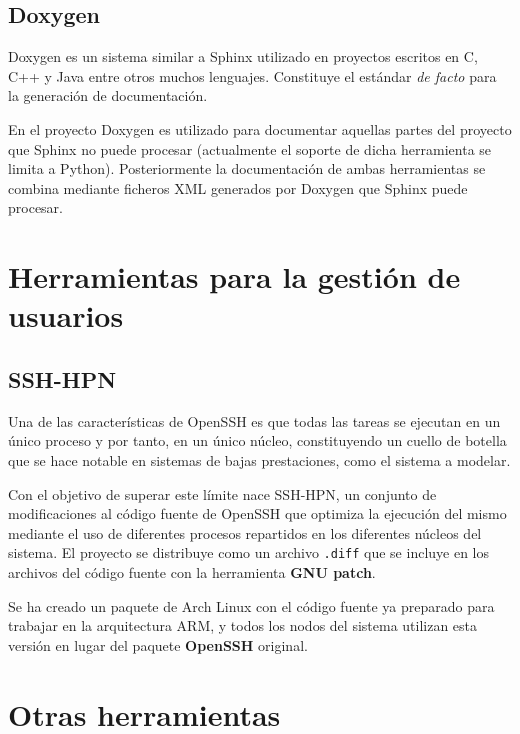 \subsection{Doxygen}

Doxygen es un sistema similar a Sphinx utilizado en proyectos escritos en C, C++ y Java entre otros muchos lenguajes. Constituye el estándar \textit{de facto} para la generación de documentación.

En el proyecto Doxygen es utilizado para documentar aquellas partes del proyecto que Sphinx no puede procesar (actualmente el soporte de dicha herramienta se limita a Python). Posteriormente la documentación de ambas herramientas se combina mediante ficheros XML generados por Doxygen que Sphinx puede procesar.

\section{Herramientas para la gestión de usuarios}

\subsection{SSH-HPN}

Una de las características de OpenSSH es que todas las tareas se ejecutan en un único proceso y por tanto, en un único núcleo, constituyendo un cuello de botella que se hace notable en sistemas de bajas prestaciones, como el sistema a modelar.

Con el objetivo de superar este límite nace SSH-HPN\citationneeded, un conjunto de modificaciones al código fuente de OpenSSH que optimiza la ejecución del mismo mediante el uso de diferentes procesos repartidos en los diferentes núcleos del sistema. El proyecto se distribuye como un archivo \texttt{.diff} que se incluye en los archivos del código fuente con la herramienta \textbf{GNU patch}.

Se ha creado un paquete de Arch Linux con el código fuente ya preparado para trabajar en la arquitectura ARM, y todos los nodos del sistema utilizan esta versión en lugar del paquete \textbf{OpenSSH} original.

\section{Otras herramientas}


